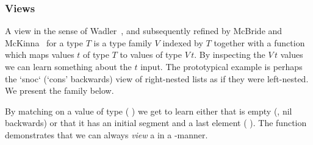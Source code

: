 \subsubsection{Views}

A view
in the sense of Wadler~\cite{DBLP:conf/popl/Wadler87},
and subsequently refined by McBride and McKinna~\cite{DBLP:journals/jfp/McBrideM04}
for a type $T$ is a type family $V$ indexed by $T$ together
with a function which maps values $t$ of type $T$ to values of type
$V\,t$.
%
By inspecting the $V\,t$ values we can learn something about the
$t$ input.
%
The prototypical example is perhaps the `snoc` (`cons' backwards) view
of right-nested lists as if they were left-nested.
We present the  family below.


By matching on a value of type
( ) we get to learn
either that  is empty (, nil backwards)
or that it has an initial segment  and a last element
 ( \IdrisData{:<} ).
%
The function  demonstrates that we can always
\emph{view} a  in a -manner.

